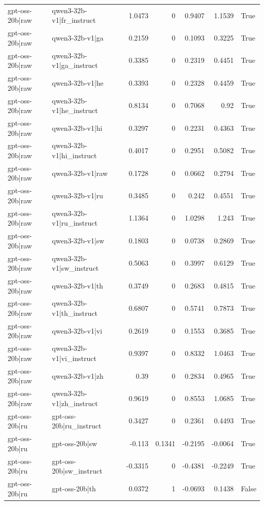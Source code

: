 \begin{table}
\begin{tabular}{l l r r r r l}
gpt-oss-20b|raw & qwen3-32b-v1|fr_instruct & 1.0473 & 0 & 0.9407 & 1.1539 & True \\
gpt-oss-20b|raw & qwen3-32b-v1|ga & 0.2159 & 0 & 0.1093 & 0.3225 & True \\
gpt-oss-20b|raw & qwen3-32b-v1|ga_instruct & 0.3385 & 0 & 0.2319 & 0.4451 & True \\
gpt-oss-20b|raw & qwen3-32b-v1|he & 0.3393 & 0 & 0.2328 & 0.4459 & True \\
gpt-oss-20b|raw & qwen3-32b-v1|he_instruct & 0.8134 & 0 & 0.7068 & 0.92 & True \\
gpt-oss-20b|raw & qwen3-32b-v1|hi & 0.3297 & 0 & 0.2231 & 0.4363 & True \\
gpt-oss-20b|raw & qwen3-32b-v1|hi_instruct & 0.4017 & 0 & 0.2951 & 0.5082 & True \\
gpt-oss-20b|raw & qwen3-32b-v1|raw & 0.1728 & 0 & 0.0662 & 0.2794 & True \\
gpt-oss-20b|raw & qwen3-32b-v1|ru & 0.3485 & 0 & 0.242 & 0.4551 & True \\
gpt-oss-20b|raw & qwen3-32b-v1|ru_instruct & 1.1364 & 0 & 1.0298 & 1.243 & True \\
gpt-oss-20b|raw & qwen3-32b-v1|sw & 0.1803 & 0 & 0.0738 & 0.2869 & True \\
gpt-oss-20b|raw & qwen3-32b-v1|sw_instruct & 0.5063 & 0 & 0.3997 & 0.6129 & True \\
gpt-oss-20b|raw & qwen3-32b-v1|th & 0.3749 & 0 & 0.2683 & 0.4815 & True \\
gpt-oss-20b|raw & qwen3-32b-v1|th_instruct & 0.6807 & 0 & 0.5741 & 0.7873 & True \\
gpt-oss-20b|raw & qwen3-32b-v1|vi & 0.2619 & 0 & 0.1553 & 0.3685 & True \\
gpt-oss-20b|raw & qwen3-32b-v1|vi_instruct & 0.9397 & 0 & 0.8332 & 1.0463 & True \\
gpt-oss-20b|raw & qwen3-32b-v1|zh & 0.39 & 0 & 0.2834 & 0.4965 & True \\
gpt-oss-20b|raw & qwen3-32b-v1|zh_instruct & 0.9619 & 0 & 0.8553 & 1.0685 & True \\
gpt-oss-20b|ru & gpt-oss-20b|ru_instruct & 0.3427 & 0 & 0.2361 & 0.4493 & True \\
gpt-oss-20b|ru & gpt-oss-20b|sw & -0.113 & 0.1341 & -0.2195 & -0.0064 & True \\
gpt-oss-20b|ru & gpt-oss-20b|sw_instruct & -0.3315 & 0 & -0.4381 & -0.2249 & True \\
gpt-oss-20b|ru & gpt-oss-20b|th & 0.0372 & 1 & -0.0693 & 0.1438 & False \\

\end{tabular}
\end{table}
